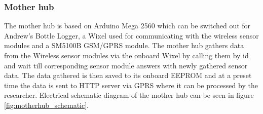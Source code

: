 \subsubsection{Mother hub}
The mother hub is based on Arduino Mega 2560\cite{arduinoMega} which can be switched out 
for Andrew's Bottle Logger\cite{ALog-BottleLogger}, a Wixel\cite{wixel} used for 
communicating with the wireless sensor modules and a SM5100B GSM/GPRS 
module\cite{SM5100B}. The mother hub gathers data from the Wireless sensor modules via 
the onboard Wixel by calling them by id and wait till corresponding sensor module answers
with newly gathered sensor data. The data gathered is then saved to its onboard EEPROM
and at a preset time the data is sent to HTTP server via GPRS where it can be processed 
by the researcher. Electrical schematic diagram of the mother hub can be seen in figure 
\ref{fig:motherhub_schematic}.
